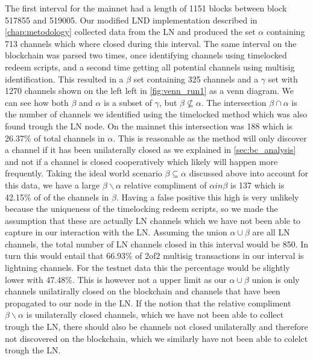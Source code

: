 The first interval for the mainnet had a length of 1151 blocks between block 517855 and 519005. Our modified LND implementation described in \cref{chap:metodology} collected data from the LN and produced the set \( \alpha \) containing 713 channels which where closed during this interval. The same interval on the blockchain was parsed two times, once identifying channels using timelocked redeem scripts, and a second time getting all potential channels using multisig identification. This resulted in a \( \beta \) set containing 325 channels and a \( \gamma \) set with 1270 channels shown on the left left in \cref{fig:venn_run1} as a venn diagram. We can see how both \( \beta \) and \(\alpha\) is a subset of \( \gamma\), but \(\beta \not\subseteq \alpha\). The intersection \(\beta \cap \alpha\) is the number of channels we identified using the timelocked method which was also found trough the LN node. On the mainnet this intersection was 188 which is 26.37\% of total channels in \( \alpha \). This is reasonable as the method will only discover a channel if it has been unilaterally closed as we explained in \cref{sec:bc_analysis} and not if a channel is closed cooperatively which likely will happen more frequently. Taking the ideal world scenario \( \beta \subseteq \alpha \) discussed above into account for this data, we have a large \( \beta \backslash{} \alpha \) relative compliment of \( \alpha in \beta \) is 137 which is 42.15\% of of the channels in \(\beta\). Having a false positive this high is very unlikely because the uniqueness of the timelocking redeem scripts, so we made the assumption that these are actually LN channels which we have not been able to capture in our interaction with the LN. 
Assuming the union \(\alpha \cup \beta \) are all LN channels, the total number of LN channels closed in this interval would be 850. In turn this would entail that 66.93\% of 2of2 multisig transactions in our interval is lightning channels. For the testnet data this the percentage would be slightly lower with 47.48\%.
This is however not a upper limit as our \(\alpha \cup \beta \) union is only channels unilatirally closed on the blockchain and channels that have been propagated to our node in the LN. If the notion that the relative compliment \( \beta \backslash{} \alpha \) is unilaterally closed channels, which we have not been able to collect trough the LN, there should also be channels not closed unilaterally and therefore not discovered on the blockchain, which we similarly have not been able to colelct trough the LN. 

